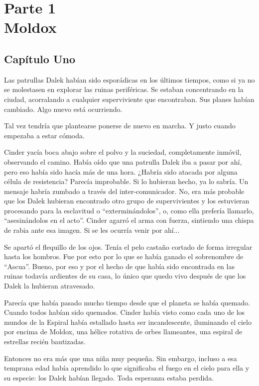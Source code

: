 \part*{Parte 1 \\ \vspace{2 mm} {\large Moldox}}
\chapter*{Capítulo Uno}

Las patrullas Dalek habían sido esporádicas en los últimos tiempos, como si ya no se molestasen en explorar las ruinas periféricas. Se estaban concentrando en la ciudad, acorralando a cualquier superviviente que encontraban. Sus planes habían cambiado. Algo nuevo está ocurriendo.

Tal vez tendría que plantearse ponerse de nuevo en marcha. Y justo cuando empezaba a estar cómoda.

Cinder yacía boca abajo sobre el polvo y la suciedad, completamente inmóvil, observando el camino. Había oído que una patrulla Dalek iba a pasar por ahí, pero eso había sido hacía más de una hora. ¿Habría sido atacada por alguna célula de resistencia? Parecía improbable. Si lo hubieran hecho, ya lo sabría. Un mensaje habría zumbado a través del inter-comunicador. No, era más probable que los Dalek hubieran encontrado otro grupo de supervivientes y los estuvieran procesando para la esclavitud o “exterminándolos”, o, como ella prefería llamarlo, ``asesinándolos en el acto''. Cinder agarró el arma con fuerza, sintiendo una chispa de rabia ante esa imagen. Si se les ocurría venir por ahí...

Se apartó el flequillo de los ojos. Tenía el pelo castaño cortado de forma irregular hasta los hombros. Fue por esto por lo que se había ganado el sobrenombre de “Ascua”. Bueno, por eso y por el hecho de que había sido encontrada en las ruinas todavía ardientes de su casa, lo único que quedo vivo después de que los Dalek la hubieran atravesado.

Parecía que había pasado mucho tiempo desde que el planeta se había quemado. Cuando todos habían sido quemados. Cinder había visto como cada uno de los mundos de la Espiral había estallado hasta ser incandescente, iluminando el cielo por encima de Moldox, una hélice rotativa de orbes llameantes, una espiral de estrellas recién bautizadas.

Entonces no era más que una niña muy pequeña. Sin embargo, incluso a esa temprana edad había aprendido lo que significaba el fuego en el cielo para ella y su especie: los Dalek habían llegado. Toda esperanza estaba perdida.

